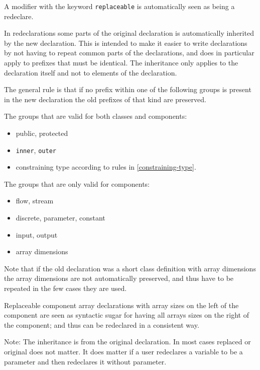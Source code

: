 A modifier with the keyword \lstinline!replaceable! is automatically seen as being a
redeclare.

In redeclarations some parts of the original declaration is
automatically inherited by the new declaration. This is intended to make
it easier to write declarations by not having to repeat common parts of
the declarations, and does in particular apply to prefixes that must be
identical. The inheritance only applies to the declaration itself and
not to elements of the declaration.

The general rule is that if no prefix within one of the following groups
is present in the new declaration the old prefixes of that kind are
preserved.

The groups that are valid for both classes and components:
\begin{itemize}
\item
  public, protected
\item
  \lstinline!inner!, \lstinline!outer!
\item
  constraining type according to rules in \autoref{constraining-type}.
\end{itemize}

The groups that are only valid for components:
\begin{itemize}
\item
  flow, stream
\item
  discrete, parameter, constant
\item
  input, output
\item
  array dimensions
\end{itemize}

Note that if the old declaration was a short class definition with array
dimensions the array dimensions are not automatically preserved, and
thus have to be repeated in the few cases they are used.

Replaceable component array declarations with array sizes on the left of
the component are seen as syntactic sugar for having all arrays sizes on
the right of the component; and thus can be redeclared in a consistent
way.

\begin{nonnormative}
Note: The inheritance is from the original declaration. In most
cases replaced or original does not matter. It does matter if a user
redeclares a variable to be a parameter and then redeclares it without
parameter.
\end{nonnormative}

